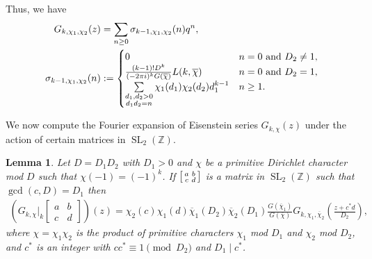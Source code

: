\documentclass[11pt,letterpaper,reqno]{amsart}
\newcommand\ques[1]{\textcolor{blue}{\textbf{Question}: #1}}
\numberwithin{figure}{section}
\numberwithin{table}{section}
\theoremstyle{definition}
\theoremstyle{plain}
\newtheorem{lemma}[theorem]{Lemma}
\theoremstyle{definition}
\theoremstyle{definition}
\theoremstyle{remark}
\numberwithin{equation}{section}
\theoremstyle{remark}
\DeclareMathOperator{\Sl}{SL}
\begin{document}
Thus, we have 
\begin{align}
    \label{eq:gkd1d2def}
    G_{k,\chi_1,\chi_2}(z)&=\sum_{n\geq0}\sigma_{k-1,\chi_1,\chi_2}(n)q^n,\\\
    \sigma_{k-1,\chi_1,\chi_2}(n)&:=\begin{cases}0&n=0{\rm~ and}~D_2\neq1,\\
       \frac{(k-1)!D^k}{(-2\pi i)^kG(\overline{\chi})}L(k,\overline{\chi}) &n=0~{\rm and}~D_2=1,\\\sum\limits_{\substack{d_1,d_2>0\\ d_1d_2=n}}\chi_1(d_1)\chi_2(d_2)d_1^{k-1} &n\geq1.
    \end{cases}\label{eq:fouriercochi1chi2}
\end{align}



We now compute the Fourier expansion of Eisenstein series $G_{k,\chi}(z)$ under the action of certain matrices in $\Sl_2(\mathbb{Z})$. 
\begin{lemma}\label{lem:FourierexpansionofGkD} Let $D=D_1D_2$ with $D_1>0$ %
and $\chi$ be a primitive Dirichlet character mod $D$ such that $\chi(-1)=(-1)^k$. If $\begin{bsmallmatrix}
    a&b\\c&d
\end{bsmallmatrix}$ is a matrix in $\Sl_2(\mathbb{Z})$ such that $\gcd(c,D)=D_1$ then
\begin{align}
    \left(G_{k,\chi}\bigg|_k\begin{bmatrix}
        a & b\\ c& d\end{bmatrix}\right)(z)=\chi_2(c)\chi_1(d)\overline{\chi}_{1}(D_2)\overline{\chi}_{2}(D_1)\frac{G(\overline{\chi}_{1})}{G(\overline{\chi})}G_{k,\chi_1,\overline{\chi}_{2}}\left(\frac{z+c^{\ast}d}{D_2}\right),   \nonumber
\end{align}
where $\chi=\chi_1\chi_2$ is the product of primitive characters $\chi_1$ mod $D_1$ and $\chi_2$ mod $D_2$, and $c^{\ast}$ is an integer with $cc^{\ast}\equiv 1\pmod{D_2}$ and $D_1\mid c^{\ast}$. %
\end{lemma}
\end{document}
